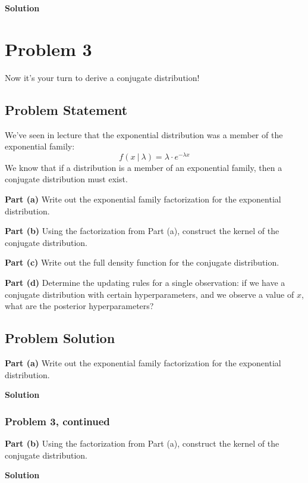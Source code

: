 \documentclass[12pt]{article}
\theoremstyle{definition}
\begin{document}
\bigskip
\noindent
{\bf Solution}


\newpage
\section*{Problem 3}

Now it's your turn to derive a conjugate distribution!

\subsection*{Problem Statement}

We've seen in lecture that the exponential distribution was a member of the exponential family:
$$
f(x\ |\ \lambda) = \lambda \cdot e^{-\lambda x}
$$
We know that if a distribution is a member of an exponential family, then a conjugate distribution must exist.

\bigskip
\noindent
{\bf Part (a)} Write out the exponential family factorization for the exponential distribution.

\bigskip
\noindent
{\bf Part (b)} Using the factorization from Part (a), construct the kernel of the conjugate distribution.

\bigskip
\noindent
{\bf Part (c)} Write out the full density function for the conjugate distribution.


\bigskip
\noindent
{\bf Part (d)} Determine the updating rules for a single observation: if we have a conjugate distribution with certain hyperparameters, and we observe a value of $x$, what are the posterior hyperparameters? 


\subsection*{Problem Solution}

\noindent
{\bf Part (a)} Write out the exponential family factorization for the exponential distribution.

\bigskip
\noindent
{\bf Solution}



\newpage
\subsubsection*{Problem 3, continued}

\noindent
{\bf Part (b)} Using the factorization from Part (a), construct the kernel of the conjugate distribution.

\bigskip
\noindent
{\bf Solution}
\end{document}
